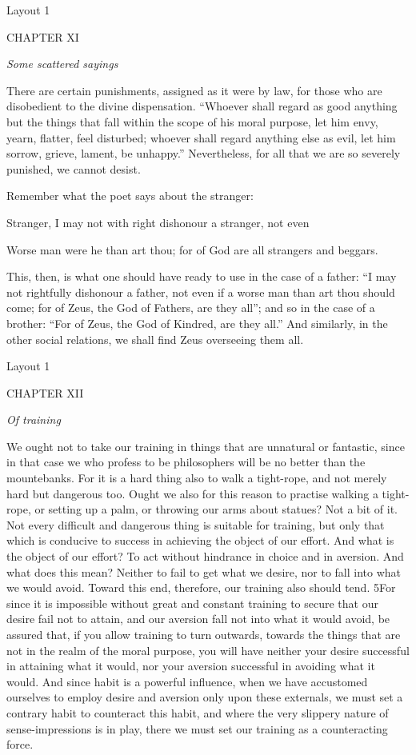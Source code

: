 

Layout 1

CHAPTER XI

\emph{Some scattered sayings}

There are certain punishments, assigned as it were by law, for those who are disobedient to the divine dispensation. ``Whoever shall regard as good anything but the things that fall within the scope of his moral purpose, let him envy, yearn, flatter, feel disturbed; whoever shall regard anything else as evil, let him sorrow, grieve, lament, be unhappy.'' Nevertheless, for all that we are so severely punished, we cannot desist.

Remember what the poet says about the stranger:

Stranger, I may not with right dishonour a stranger, not even

Worse man were he than art thou; for of God are all strangers and beggars.

This, then, is what one should have ready to use in the case of a father: ``I may not rightfully dishonour a father, not even if a worse man than art thou should come; for of Zeus, the God of Fathers, are they all''; and so in the case of a brother: ``For of Zeus, the God of Kindred, are they all.'' And similarly, in the other social relations, we shall find Zeus overseeing them all.



Layout 1

CHAPTER XII

\emph{Of training}

We ought not to take our training in things that are unnatural or fantastic, since in that case we who profess to be philosophers will be no better than the mountebanks. For it is a hard thing also to walk a tight-rope, and not merely hard but dangerous too. Ought we also for this reason to practise walking a tight-rope, or setting up a palm, or throwing our arms about statues? Not a bit of it. Not every difficult and dangerous thing is suitable for training, but only that which is conducive to success in achieving the object of our effort. And what is the object of our effort? To act without hindrance in choice and in aversion. And what does this mean? Neither to fail to get what we desire, nor to fall into what we would avoid. Toward this end, therefore, our training also should tend. 5For since it is impossible without great and constant training to secure that our desire fail not to attain, and our aversion fall not into what it would avoid, be assured that, if you allow training to turn outwards, towards the things that are not in the realm of the moral purpose, you will have neither your desire successful in attaining what it would, nor your aversion successful in avoiding what it would. And since habit is a powerful influence, when we have accustomed ourselves to employ desire and aversion only upon these externals, we must set a contrary habit to counteract this habit, and where the very slippery nature of sense-impressions is in play, there we must set our training as a counteracting force.

